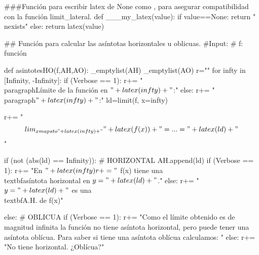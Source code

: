 \begin{sagesilent}
###Función para escribir latex de None como \nexists, para asegurar compatibilidad con la función limit_lateral.
def ___my_latex(value):
    if value==None:
        return "\\nexists"
    else:
        return latex(value)

## Función para calcular las asíntotas horizontales u oblicuas.
#Input:
# f: función

def asintotesHO(f,AH,AO):
    _emptylist(AH)
    _emptylist(AO)
    r=""
    for infty in [Infinity, -Infinity]:
        if (Verbose == 1):
            r+= "\\paragraph{Límite de la función en $"+latex(infty)+"$:}"
        else:
            r+= "\\paragraph{$"+latex(infty)+"$:}"
        ld=limit(f, x=infty)  

        r+= "\[\\lim_{x\\mapsto "+latex(infty)+"}" + latex(f(x)) + "= ... = "+latex(ld)+"\]"    

        if (not (abs(ld) == Infinity)): # HORIZONTAL
            AH.append(ld)
            if (Verbose == 1):
                r+= "En $"+latex(infty)
                r+= "$ f(x) tiene una \\textbf{asíntota horizontal} en $y = "+latex(ld)+"$."
            else:
                r+= "$y = "+latex(ld) +" $ es una \\textbf{A.H.} de f(x)"

        else: # OBLICUA
            if (Verbose == 1):
                r+= "Como el límite obtenido es de magnitud infinita la función no tiene asíntota horizontal, pero puede tener una asíntota oblícua. Para saber si tiene una asíntota oblícua calculamos: "
            else:
                r+= "No tiene horizontal. ¿Oblícua?"


\end{sagesilent}
